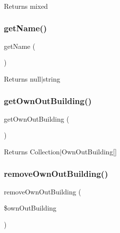 \begin{DoxyReturn}{Returns}
mixed 
\end{DoxyReturn}
\mbox{\label{class_app_1_1_entity_1_1_out_building_a3d0963e68bb313b163a73f2803c64600}} 
\subsubsection{\texorpdfstring{getName()}{getName()}}
{\footnotesize\ttfamily get\+Name (\begin{DoxyParamCaption}{ }\end{DoxyParamCaption})}

\begin{DoxyReturn}{Returns}
null$\vert$string 
\end{DoxyReturn}
\mbox{\label{class_app_1_1_entity_1_1_out_building_aaf190d3aab26b67e86cfa0d759a0a9e6}} 
\subsubsection{\texorpdfstring{getOwnOutBuilding()}{getOwnOutBuilding()}}
{\footnotesize\ttfamily get\+Own\+Out\+Building (\begin{DoxyParamCaption}{ }\end{DoxyParamCaption})}

\begin{DoxyReturn}{Returns}
Collection$\vert$\+Own\+Out\+Building\mbox{[}\mbox{]} 
\end{DoxyReturn}
\mbox{\label{class_app_1_1_entity_1_1_out_building_a86b76f753808f1339ddca94a754da3d2}} 
\subsubsection{\texorpdfstring{removeOwnOutBuilding()}{removeOwnOutBuilding()}}
{\footnotesize\ttfamily remove\+Own\+Out\+Building (\begin{DoxyParamCaption}\item[{\mbox{\hyperlink{class_app_1_1_entity_1_1_own_out_building}{Own\+Out\+Building}}}]{\$own\+Out\+Building }\end{DoxyParamCaption})}


